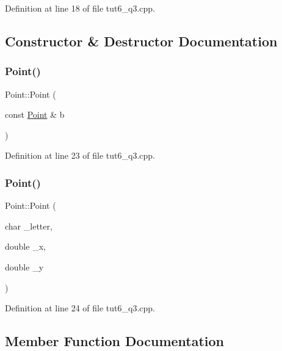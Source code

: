 Definition at line 18 of file tut6\+\_\+q3.\+cpp.



\subsection{Constructor \& Destructor Documentation}
\mbox{\label{struct_point_a6e3c30c51464aef7ffc341246fd5f350}} 
\subsubsection{\texorpdfstring{Point()}{Point()}\hspace{0.1cm}{\footnotesize\ttfamily [1/2]}}
{\footnotesize\ttfamily Point\+::\+Point (\begin{DoxyParamCaption}\item[{const \hyperlink{struct_point}{Point} \&}]{b }\end{DoxyParamCaption})\hspace{0.3cm}{\ttfamily [inline]}}



Definition at line 23 of file tut6\+\_\+q3.\+cpp.

\mbox{\label{struct_point_ab42957117da0adbb5d5838106e3c7a0c}} 
\subsubsection{\texorpdfstring{Point()}{Point()}\hspace{0.1cm}{\footnotesize\ttfamily [2/2]}}
{\footnotesize\ttfamily Point\+::\+Point (\begin{DoxyParamCaption}\item[{char}]{\+\_\+letter,  }\item[{double}]{\+\_\+x,  }\item[{double}]{\+\_\+y }\end{DoxyParamCaption})\hspace{0.3cm}{\ttfamily [inline]}}



Definition at line 24 of file tut6\+\_\+q3.\+cpp.



\subsection{Member Function Documentation}
\mbox{\label{struct_point_a1b3079414ffe1de3dbc74516a71a4007}} 
